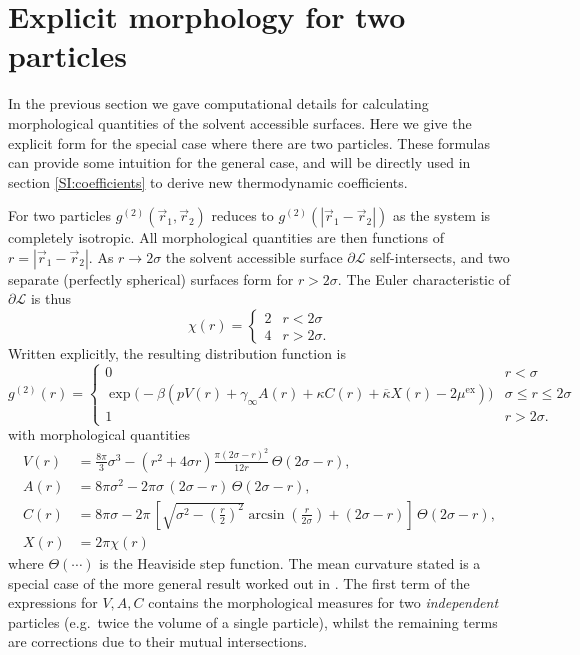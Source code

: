 \documentclass[11pt,twoside]{report}
\def\includebibliography{}
\begin{document}
\chapter{Explicit morphology for two particles}
\label{appendix:two-spheres}

In the previous section we gave computational details for calculating morphological quantities of the solvent accessible surfaces.
Here we give the explicit form for the special case where there are two particles.
These formulas can provide some intuition for the general case, and will be directly used in section \ref{SI:coefficients} to derive new thermodynamic coefficients.

For two particles $g^{(2)}(\vec{r}_1, \vec{r}_2)$ reduces to $g^{(2)}(|\vec{r}_1 - \vec{r}_2|)$ as the system is completely isotropic.
All morphological quantities are then functions of $r = |\vec{r}_1 - \vec{r}_2|$.
As $r \to 2\sigma$ the solvent accessible surface $\partial\mathcal{L}$ self-intersects, and two separate (perfectly spherical) surfaces form for $r > 2\sigma$.
The Euler characteristic of $\partial\mathcal{L}$ is thus
\begin{equation}
  \chi(r) =
  \begin{cases}
    2 & r < 2\sigma \\
    4 & r > 2\sigma.
  \end{cases}
\end{equation}
Written explicitly, the resulting distribution function is
\begin{equation}\label{eq:g2-explicit}
  g^{(2)}(r) =
  \begin{cases}
    0 & r < \sigma \\
    \exp{\Big(-\beta (pV(r) + \gamma_\infty A(r) + \kappa C(r) + \overline{\kappa} X(r) - 2\mu^\mathrm{ex})\Big)} &
    \sigma \le r \le 2\sigma \\
    1 & r > 2\sigma.
  \end{cases}
\end{equation}
with morphological quantities
\begin{subequations}\label{eq:g2-explicit-morph}
\begin{align}
  V(r) &= \frac{8\pi}{3} \sigma^3 - (r^2 + 4\sigma r) \frac{\pi (2\sigma - r)^2}{12 r} \, \Theta(2\sigma-r), \\
  A(r) &= 8\pi\sigma^2 - 2\pi\sigma \, (2\sigma-r) \, \Theta(2\sigma-r), \\
  C(r) &=
  8\pi\sigma - 2\pi \, \left[ \sqrt{\sigma^2 - \left(\frac{r}{2}\right)^2} \arcsin{\left(\frac{r}{2\sigma}\right)}
    + (2\sigma-r) \right] \, \Theta(2\sigma-r), \\
  X(r) &= 2\pi \chi(r)
\end{align}
\end{subequations}
where $\Theta(\cdots)$ is the Heaviside step function.
The mean curvature stated is a special case of the more general result worked out in \cite{OettelEL2009}.
The first term of the expressions for $V,A,C$ contains the morphological measures for two \emph{independent} particles (e.g.\ twice the volume of a single particle), whilst the remaining terms are corrections due to their mutual intersections.

\ifdefined\includebibliography
  \printbibliography
\fi
\end{document}
